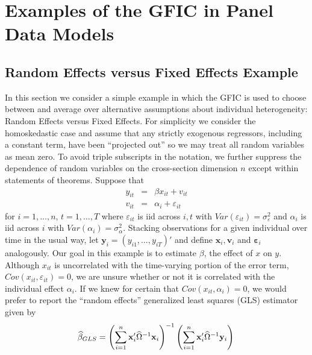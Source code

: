 \section{Examples of the GFIC in Panel Data Models}
\label{sec:examples}

\subsection{Random Effects versus Fixed Effects Example}
\label{sec:REvsFE}
In this section we consider a simple example in which the GFIC is used to choose between and average over alternative assumptions about individual heterogeneity: Random Effects versus Fixed Effects.
For simplicity we consider the homoskedastic case and assume that any strictly exogenous regressors, including a constant term, have been ``projected out'' so we may treat all random variables as mean zero.
To avoid triple subscripts in the notation, we further suppress the dependence of random variables on the cross-section dimension $n$ except within statements of theorems.
Suppose that
\begin{eqnarray}
  y_{it} &=& \beta x_{it}+ v_{it}\\
  v_{it} &=& \alpha_i + \varepsilon_{it}
  \label{eq:REvsFEmodel}
\end{eqnarray}
for $i = 1, \hdots, n$, $t=1, \hdots, T$ where $\varepsilon_{it}$ is iid across $i,t$ with $Var(\varepsilon_{it}) = \sigma^2_{\varepsilon}$ and $\alpha_i$ is iid across $i$ with $Var\left( \alpha_i \right)=\sigma^2_{\alpha}$.
Stacking observations for a given individual over time in the usual way, let $\mathbf{y}_i = (y_{i1}, \hdots, y_{iT})'$ and define $\mathbf{x}_i, \mathbf{v}_i$ and $\boldsymbol{\varepsilon}_i$ analogously.
Our goal in this example is to estimate $\beta$, the effect of $x$ on $y$.
Although $x_{it}$ is uncorrelated with the time-varying portion of the error term, $Cov(x_{it},\varepsilon_{it})=0$, we are unsure whether or not it is correlated with the individual effect $\alpha_i$. 
If we knew for certain that $Cov(x_{it},\alpha_i)=0$, we would prefer to report the ``random effects'' generalized least squares (GLS) estimator given by
\begin{equation}
  \widehat{\beta}_{GLS} = \left(\sum_{i=1}^{n} \mathbf{x}_i' \widehat{\Omega}^{-1} \mathbf{x}_i\right)^{-1}\left(\sum_{i=1}^{n} \mathbf{x}_i'  \widehat{\Omega}^{-1} \mathbf{y}_i   \right)\\
  \label{eq:REdef}
\end{equation}
